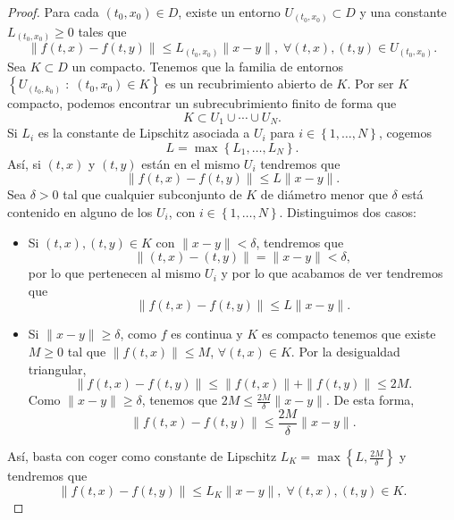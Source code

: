 \begin{proof}
	Para cada $\displaystyle \left(t_{0}, x_{0}\right)\in D $, existe un entorno $\displaystyle U_{\left(t_{0}, x_{0}\right)}\subset D $ y una constante $\displaystyle L_{\left(t_{0}, x_{0}\right)} \geq 0$ tales que
	\[\|f\left(t,x\right)-f\left(t,y\right)\| \leq L_{\left(t_{0}, x_{0}\right)}\|x-y\| , \; \forall\left(t,x\right), \left(t,y\right)\in U_{\left(t_{0}, x_{0}\right)}.\]
	Sea $\displaystyle K \subset D $ un compacto. Tenemos que la familia de entornos $\displaystyle \left\{ U_{\left(t_{0}, k_{0}\right)}\; : \; \left(t_{0}, x_{0}\right)\in K\right\}  $ es un recubrimiento abierto de $\displaystyle K $. Por ser $\displaystyle K $ compacto, podemos encontrar un subrecubrimiento finito de forma que 
	\[K \subset U_{1} \cup \cdots \cup U_{N} .\]
	Si $\displaystyle L_{i} $ es la constante de Lipschitz asociada a $\displaystyle U_{i} $ para $\displaystyle i \in \left\{ 1, \ldots, N\right\}  $, cogemos 
	\[L = \max \left\{ L_{1}, \ldots, L_{N}\right\}  .\]
	Así, si $\displaystyle \left(t,x\right) $ y $\displaystyle \left(t,y\right) $ están en el mismo $\displaystyle U_{i} $ tendremos que 
	\[\|f\left(t,x\right)-f\left(t,y\right)\|\leq L\|x-y\| .\]
	Sea $\displaystyle \delta > 0 $ tal que cualquier subconjunto de $\displaystyle K $ de diámetro menor que $\displaystyle \delta  $ está contenido en alguno de los $\displaystyle U_{i} $, con $\displaystyle i \in \left\{ 1, \ldots, N\right\}  $. Distinguimos dos casos:
	\begin{itemize}
	\item Si $\displaystyle \left(t,x\right), \left(t,y\right) \in K $ con $\displaystyle \|x-y\|<\delta  $, tendremos que 
		\[\|\left(t, x\right)-\left(t,y\right)\| = \|x-y\|<\delta  ,\]
		por lo que pertenecen al mismo $\displaystyle U_{i} $ y por lo que acabamos de ver tendremos que 
		\[\|f\left(t,x\right)-f\left(t,y\right)\|\leq L\|x-y\| .\]
	\item Si $\displaystyle \|x-y\|\geq \delta  $, como $\displaystyle f $ es continua y $\displaystyle K $ es compacto tenemos que existe $\displaystyle M \geq 0 $ tal que $\displaystyle \|f\left(t,x\right)\|\leq M $, $\displaystyle \forall\left(t,x\right)\in K $. Por la desigualdad triangular, 
		\[\|f\left(t,x\right)-f\left(t,y\right)\|\leq \|f\left(t,x\right)\|+\|f\left(t,y\right)\|\leq 2M .\]
		Como $\displaystyle \|x-y\|\geq \delta  $, tenemos que $\displaystyle 2M \leq \frac{2M}{\delta }\|x-y\| $. De esta forma, 
		\[\|f\left(t,x\right)-f\left(t,y\right)\|\leq \frac{2M}{\delta }\|x-y \|.\]
	\end{itemize}
	Así, basta con coger como constante de Lipschitz $\displaystyle L_{K}=\max \left\{ L, \frac{2M}{\delta }\right\}  $ y tendremos que 
	\[\|f\left(t,x\right)-f\left(t,y\right)\|\leq L_{K}\|x-y\|, \; \forall\left(t,x\right), \left(t,y\right)\in K .\]
\end{proof}
